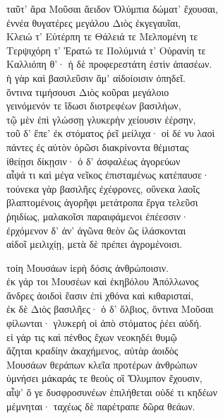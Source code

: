 \quad{}ταῦτ' ἄρα Μοῦσαι ἄειδον Ὀλύμπια δώματ' ἔχουσαι, \\
ἐννέα θυγατέρες μεγάλου Διὸς ἐκγεγαυῖαι,\\
Κλειώ τ' Εὐτέρπη τε Θάλειά τε Μελπομένη τε\\
Τερψιχόρη τ' Ἐρατώ τε Πολύμνιά τ' Οὐρανίη τε\\
Καλλιόπη θ'· ἡ δὲ προφερεστάτη ἐστὶν ἁπασέων. \\
ἡ γὰρ καὶ βασιλεῦσιν ἅμ' αἰδοίοισιν ὀπηδεῖ.  \\
ὅντινα τιμήσουσι Διὸς κοῦραι μεγάλοιο\\
γεινόμενόν τε ἴδωσι διοτρεφέων βασιλήων,\\
τῷ μὲν ἐπὶ γλώσσῃ γλυκερὴν χείουσιν ἐέρσην,\\
τοῦ δ' ἔπε' ἐκ στόματος ῥεῖ μείλιχα· οἱ δέ νυ λαοὶ \\
πάντες ἐς αὐτὸν ὁρῶσι διακρίνοντα θέμιστας \\
ἰθείῃσι δίκῃσιν· ὁ δ' ἀσφαλέως ἀγορεύων\\
αἶψά τι καὶ μέγα νεῖκος ἐπισταμένως κατέπαυσε· \\
τούνεκα γὰρ βασιλῆες ἐχέφρονες, οὕνεκα λαοῖς \\
βλαπτομένοις ἀγορῆφι μετάτροπα ἔργα τελεῦσι\\
ῥηιδίως, μαλακοῖσι παραιφάμενοι ἐπέεσσιν·  \\
ἐρχόμενον δ' ἀν' ἀγῶνα θεὸν ὣς ἱλάσκονται\\
αἰδοῖ μειλιχίῃ, μετὰ δὲ πρέπει ἀγρομένοισι. 

\quad{}τοίη Μουσάων ἱερὴ δόσις ἀνθρώποισιν.\\
ἐκ γάρ τοι Μουσέων καὶ ἑκηβόλου Ἀπόλλωνος\\
ἄνδρες ἀοιδοὶ ἔασιν ἐπὶ χθόνα καὶ κιθαρισταί, \\
ἐκ δὲ Διὸς βασιλῆες· ὁ δ' ὄλβιος, ὅντινα Μοῦσαι\\
φίλωνται· γλυκερή οἱ ἀπὸ στόματος ῥέει αὐδή. \\
εἰ γάρ τις καὶ πένθος ἔχων νεοκηδέι θυμῷ\\
ἄζηται κραδίην ἀκαχήμενος, αὐτὰρ ἀοιδὸς\\
Μουσάων θεράπων κλεῖα προτέρων ἀνθρώπων  \\
ὑμνήσει μάκαράς τε θεοὺς οἳ Ὄλυμπον ἔχουσιν, \\
αἶψ' ὅ γε δυσφροσυνέων ἐπιλήθεται οὐδέ τι κηδέων\\
μέμνηται· ταχέως δὲ παρέτραπε δῶρα θεάων. 

